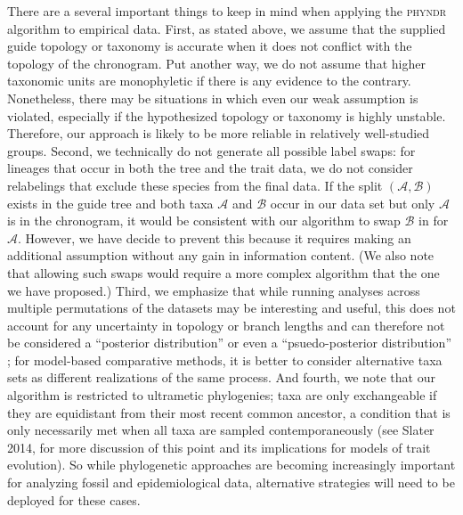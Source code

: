 \documentclass[a4paper,11pt]{article}
\begin{document}
There are a several important things to keep in mind when applying the \textsc{phyndr} algorithm to empirical data. First, as stated above, we assume that the supplied guide topology or taxonomy is accurate when it does not conflict with the topology of the chronogram. Put another way, we do not assume that higher taxonomic units are monophyletic if there is any evidence to the contrary. Nonetheless, there may be situations in which even our weak assumption is violated, especially if the hypothesized topology or taxonomy is highly unstable. Therefore, our approach is likely to be more reliable in relatively well-studied groups. Second, we technically do not generate all possible label swaps: for lineages that occur in both the tree and the trait data, we do not consider relabelings that exclude these species from the final data. If the split $(\mathcal{A,B})$ exists in the guide tree and both taxa $\mathcal{A}$ and $\mathcal{B}$ occur in our data set but only $\mathcal{A}$ is in the chronogram, it would be consistent with our algorithm to swap $\mathcal{B}$ in for $\mathcal{A}$. However, we have decide to prevent this because it requires making an additional assumption without any gain in information content. (We also note that allowing such swaps would require a more complex algorithm that the one we have proposed.) Third, we emphasize that while running analyses across multiple permutations of the datasets may be interesting and useful, this does not account for any uncertainty in topology or branch lengths and can therefore not be considered a ``posterior distribution'' or even a ``psuedo-posterior distribution'' \citep[\emph{sensu}][]{ThomasPastis}; for model-based comparative methods, it is better to consider alternative taxa sets as different realizations of the same process. And fourth, we note that our algorithm is restricted to ultrametic phylogenies; taxa are only exchangeable if they are equidistant from their most recent common ancestor, a condition that is only necessarily met when all taxa are sampled contemporaneously (see Slater 2014, for more discussion of this point and its implications for models of trait evolution). So while phylogenetic approaches are becoming increasingly important for analyzing fossil and epidemiological data, alternative strategies will need to be deployed for these cases.
\end{document}
